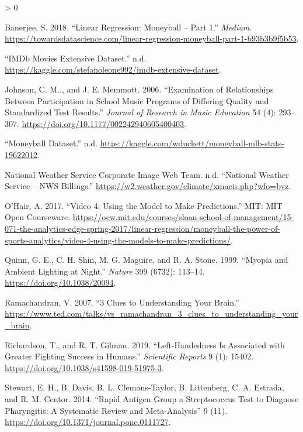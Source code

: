 \documentclass[
]{report}
\newlength{\cslhangindent}
\newenvironment{CSLReferences}[2] %
 {%
  \setlength{\parindent}{0pt}
  \ifodd #1 \everypar{\setlength{\hangindent}{\cslhangindent}}\ignorespaces\fi
  \ifnum #2 > 0
  \setlength{\parskip}{#2\baselineskip}
  \fi
 }%
 {}
\begin{document}
\begin{CSLReferences}{1}{0}
\leavevmode\hypertarget{ref-banerjee2018}{}%
Banerjee, S. 2018. {``Linear Regression: Moneyball -- Part 1.''} \emph{Medium}. \url{https://towardsdatascience.com/linear-regression-moneyball-part-1-b93b3b9f5b53}.

\leavevmode\hypertarget{ref-imdb}{}%
{``{IMDb} Movies Extensive Dataset.''} n.d. \url{https://kaggle.com/stefanoleone992/imdb-extensive-dataset}.

\leavevmode\hypertarget{ref-johnson2006}{}%
Johnson, C. M.., and J. E. Memmott. 2006. {``Examination of Relationships Between Participation in School Music Programs of Differing Quality and Standardized Test Results.''} \emph{Journal of Research in Music Education} 54 (4): 293--307. \url{https://doi.org/10.1177/002242940605400403}.

\leavevmode\hypertarget{ref-moneyball}{}%
{``Moneyball Dataset.''} n.d. \url{https://kaggle.com/wduckett/moneyball-mlb-stats-19622012}.

\leavevmode\hypertarget{ref-weather}{}%
National Weather Service Corporate Image Web Team. n.d. {``National Weather Service -- {NWS} Billings.''} \url{https://w2.weather.gov/climate/xmacis.php?wfo=byz}.

\leavevmode\hypertarget{ref-ohair2017}{}%
O'Hair, A. 2017. {``Video 4: Using the Model to Make Predictions.''} {MIT}: {MIT Open Courseware}. \url{https://ocw.mit.edu/courses/sloan-school-of-management/15-071-the-analytics-edge-spring-2017/linear-regression/moneyball-the-power-of-sports-analytics/video-4-using-the-models-to-make-predictions/}.

\leavevmode\hypertarget{ref-quinn1999}{}%
Quinn, G. E., C. H. Shin, M. G. Maguire, and R. A. Stone. 1999. {``Myopia and Ambient Lighting at Night.''} \emph{Nature} 399 (6732): 113--14. \url{https://doi.org/10.1038/20094}.

\leavevmode\hypertarget{ref-ramachandran2007}{}%
Ramachandran, V. 2007. {``3 Clues to Understanding Your Brain.''} \url{https://www.ted.com/talks/vs_ramachandran_3_clues_to_understanding_your_brain}.

\leavevmode\hypertarget{ref-richardson2019}{}%
Richardson, T., and R. T. Gilman. 2019. {``Left-Handedness Is Associated with Greater Fighting Success in Humans.''} \emph{Scientific Reports} 9 (1): 15402. \url{https://doi.org/10.1038/s41598-019-51975-3}.

\leavevmode\hypertarget{ref-stewart2014}{}%
Stewart, E. H., B. Davis, B. L. Clemans-Taylor, B. Littenberg, C. A. Estrada, and R. M. Centor. 2014. {``Rapid Antigen Group a Streptococcus Test to Diagnose Pharyngitis: A Systematic Review and Meta-Analysis''} 9 (11). \url{https://doi.org/10.1371/journal.pone.0111727}.


\end{CSLReferences}
\end{document}
